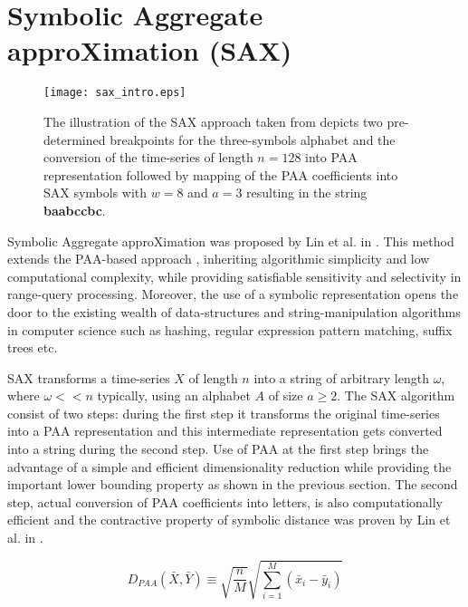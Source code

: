 \section{Symbolic Aggregate approXimation (SAX)} \label{sax}
\begin{figure}[tbp]
   \centering
   \texttt{[image: sax\_intro.eps]}
   \caption{The illustration of the SAX approach taken from \cite{citeulike:2821475} depicts two pre-determined breakpoints for the three-symbols alphabet and the conversion of the time-series of length $n=128$ into PAA representation followed by mapping of the PAA coefficients into SAX symbols with $w=8$ and $a=3$ resulting in the string \textbf{baabccbc}.}
   \label{fig:sax_intro}
\end{figure}

Symbolic Aggregate approXimation was proposed by Lin et al. in \cite{citeulike:2821475}. This method extends the PAA-based approach \cite{citeulike:2946589} \cite{citeulike:3000416}, inheriting algorithmic simplicity and low computational complexity, while providing satisfiable sensitivity and selectivity in range-query processing. Moreover, the use of a symbolic representation opens the door to the existing wealth of data-structures and string-manipulation algorithms in computer science such as hashing, regular expression pattern matching, suffix trees etc.

SAX transforms a time-series $X$ of length $n$ into a string of arbitrary length $\omega$, where $\omega << n$ typically, using an alphabet $A$ of size $ a \geq 2$. The SAX algorithm consist of two steps: during the first step it transforms the original time-series into a PAA representation and this intermediate representation gets converted into a string during the second step. Use of PAA at the first step brings the advantage of a simple and efficient dimensionality reduction while providing the important lower bounding property as shown in the previous section. The second step, actual conversion of PAA coefficients into letters, is also computationally efficient and the contractive property of symbolic distance was proven by Lin et al. in \cite{citeulike:532335}.

\begin{equation}
D_{PAA}(\bar{X}, \bar{Y}) \equiv \sqrt{\frac{n}{M}} \sqrt{ \sum_{i=1}^{M} 
\left(  \bar{x}_{i} - \bar{y}_{i} \right)}
\label{eq:paa_distance}
\end{equation}

